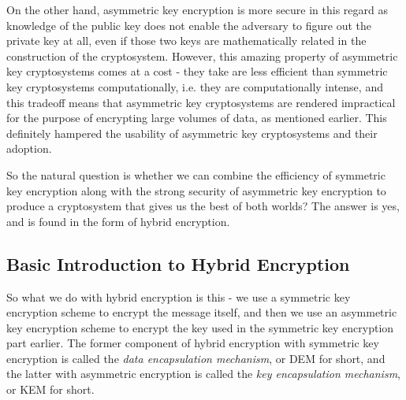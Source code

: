 On the other hand, asymmetric key encryption is more secure in this regard as knowledge of the public key does not enable the adversary to figure out the private key at all, even if those two keys are mathematically related in the construction of the cryptosystem. However, this amazing property of asymmetric key cryptosystems comes at a cost - they take are less efficient than symmetric key cryptosystems computationally, i.e. they are computationally intense, and this tradeoff means that asymmetric key cryptosystems are rendered impractical for the purpose of encrypting large volumes of data, as mentioned earlier. This definitely hampered the usability of asymmetric key cryptosystems and their adoption.

So the natural question is whether we can combine the efficiency of symmetric key encryption along with the strong security of asymmetric key encryption to produce a cryptosystem that gives us the best of both worlds? The answer is yes, and is found in the form of hybrid encryption.

\subsection{Basic Introduction to Hybrid Encryption}
So what we do with hybrid encryption is this - we use a symmetric key encryption scheme to encrypt the message itself, and then we use an asymmetric key encryption scheme to encrypt the key used in the symmetric key encryption part earlier. The former component of hybrid encryption with symmetric key encryption is called the \textit{data encapsulation mechanism}, or DEM for short, and the latter with asymmetric encryption is called the \textit{key encapsulation mechanism}, or KEM for short.\cite{kuro_he}

